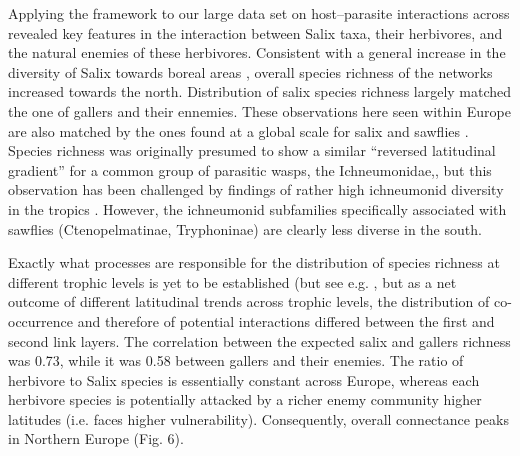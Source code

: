\documentclass[12pt]{article}
\begin{document}
Applying the framework to our large data set on host–parasite interactions
across revealed key features in the interaction between Salix taxa, their
herbivores, and the natural enemies of these herbivores. Consistent with a
general increase in the diversity of Salix towards boreal areas
\citep{Cronk2015}, overall species richness of the networks increased towards
the north. Distribution of salix species richness  largely matched the one of
gallers and their ennemies. These observations here seen within Europe are
also matched by the ones found at a global scale for salix \citep{Argus1997,
Cronk2015, Wu2015} and sawflies \citep{Kouki1994, Kouki1999}. Species richness
was originally presumed to show a similar “reversed latitudinal gradient” for
a common group of parasitic wasps, the Ichneumonidae,, but this observation
has been challenged by findings of rather high ichneumonid diversity in the
tropics \citep{Veijalainen2013}. However, the ichneumonid subfamilies
specifically associated with sawflies (Ctenopelmatinae, Tryphoninae) are
clearly less diverse in the south.

Exactly what processes are responsible for the distribution of species
richness at different trophic levels is yet to be established (but see e.g.
\citealt{Roininen2005, Nyman2010, Leppanen2014}, but as a net
outcome of different latitudinal trends across trophic levels, the
distribution of co-occurrence and therefore of potential interactions differed
between the first and second link layers. The correlation between the expected
salix and gallers richness was 0.73, while it was 0.58 between gallers and
their enemies. The ratio of herbivore to Salix species is essentially constant
across Europe, whereas each herbivore species is potentially attacked by a
richer enemy community higher latitudes (i.e. faces higher vulnerability).
Consequently, overall connectance peaks in Northern Europe (Fig. 6).
\end{document}
